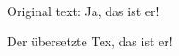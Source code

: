 \documentclass{book}
\begin{document}
\begin{pages}
\begin{Leftside}
\beginnumbering
{}

Original text: Ja, das ist er!
\pend
\end{Leftside}

\begin{Rightside}
\beginnumbering
{}

Der übersetzte Tex, das ist er!
\pend
\endnumbering
\end{Rightside}
\end{pages}

\Pages
\end{document}
